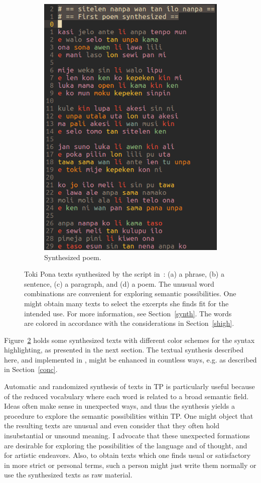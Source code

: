 \begin{figure}
\begin{subfigure}{.6\textwidth}
        \includegraphics[width=.8\linewidth]{figs/poem_}\vspace{-0.15cm}
          \caption{Synthesized poem.}
            \label{fig:sfig2}
  \end{subfigure}
  \caption{Toki Pona texts synthesized by the  script
  in~\cite{tokipona}: (a) a phrase, (b) a sentence, (c) a paragraph,
  and (d) a poem.
  The unusual word combinations are convenient for exploring semantic
  possibilities.
  One might obtain many texts to select the excerpts
  she finds fit for the intended use.
  For more information, see Section~\ref{synth}.
  The words are colored in accordance with the considerations
  in Section~\ref{shigh}.}
  \label{fig:syn}
\end{figure}

Figure~\ref{fig:syn} holds some synthesized texts
with different color schemes for the syntax highlighting,
as presented in the next section.
The textual synthesis described here,
and implemented in ,
might be enhanced in countless ways,
e.g. as described in Section~\ref{conc}.

Automatic and randomized synthesis of texts in TP is particularly
useful because of the reduced vocabulary where each word is related
to a broad semantic field.
Ideas often make sense in unexpected ways, and thus
the synthesis yields a procedure to 
explore the semantic possibilities within TP.
One might object that the resulting texts are unusual 
and even consider that they often hold insubstantial or unsound meaning.
I advocate that these unexpected formations are desirable
for exploring the possibilities of the language and of thought,
and for artistic endeavors.
Also, to obtain texts which one finds usual or satisfactory
in more strict or personal terms, such a person might just write
them normally or use the synthesized texts as raw material.

